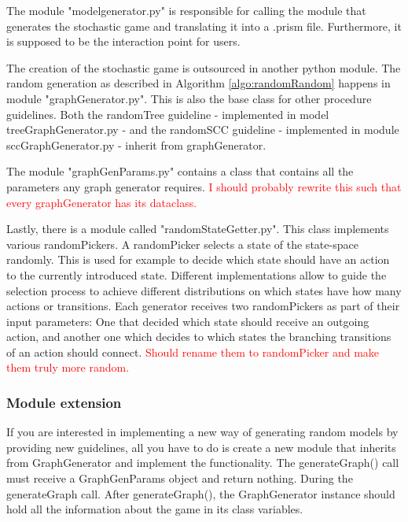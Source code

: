 The module "modelgenerator.py" is responsible for calling the module that generates the stochastic game and translating it into a .prism file. 
Furthermore, it is supposed to be the interaction point for users.

The creation of the stochastic game is outsourced in another python module. The random generation as described in Algorithm \ref{algo:randomRandom} happens in
module "graphGenerator.py". This is also the base class for other procedure guidelines. 
Both the randomTree guideline - implemented in model treeGraphGenerator.py - and the randomSCC guideline - implemented in module sccGraphGenerator.py - inherit
from graphGenerator.

The module "graphGenParams.py" contains a class that contains all the parameters any graph generator requires. 
\textcolor{red}{I should probably rewrite this such that every graphGenerator has its dataclass.}

Lastly, there is a module called "randomStateGetter.py". This class implements various randomPickers.
A randomPicker selects a state of the state-space randomly.
This is used for example to decide which state should have an action to the currently introduced state.
Different implementations allow to guide the selection process to achieve different distributions on which states have how many actions or transitions.
Each generator receives two randomPickers as part of their input parameters: One that decided which state should receive an outgoing action, 
and another one which decides to which states the branching transitions of an action should connect.
\textcolor{red}{Should rename them to randomPicker and make them truly more random.}

\subsubsection*{Module extension}
If you are interested in implementing a new way of generating random models by providing new guidelines, all you have to do is create a new
module that inherits from GraphGenerator and implement the functionality. The generateGraph() call must receive a GraphGenParams object and return nothing.
During the generateGraph call. After generateGraph(), the GraphGenerator instance should hold all the information about the game in its class variables.
